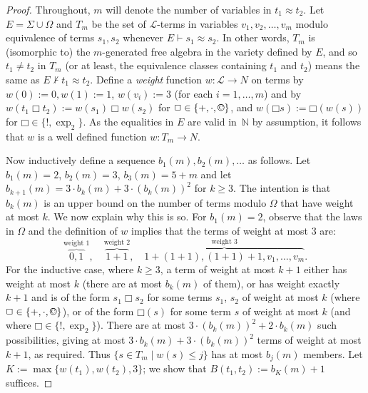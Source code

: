 \documentclass[eqnor,reqno]{amsart}
\theoremstyle{plain}
\theoremstyle{definition}
\newcommand{\cc}{\mathbin{\textup{\copyright}}}
\newcommand{\bbox}{\mathbin{\Box}}
\begin{document}
\begin{proof}
Throughout, $m$ will denote the number of variables in $t_1\approx t_2$.
Let $E= \Sigma\cup\Omega$ and $T_m$ be the set of $\mathscr{L}$-terms in variables $v_1,v_2, \dots ,v_m$ modulo equivalence of terms $s_1,s_2$ whenever $E \vdash s_1\approx s_2$.  In other words, $T_m$ is (isomorphic to) the $m$-generated free algebra in the variety defined by $E$, and so $t_1 \neq t_2$ in $T_m$ (or at least, the equivalence classes containing $t_1$ and $t_2$) means the same as $E\nvdash t_1\approx t_2$. 
Define a \emph{weight} function $w: \mathscr{L} \rightarrow N$ on terms by $w(0):=0 ,w(1):=1$, $w(v_i):=3$ (for each $i=1,\dots,m$) and by $w(t_1 \bbox t_2):=w(s_1)\bbox w(s_2)$ for $\bbox \in \{+,\cdot,\cc\}$, and $w(\bbox s):=\bbox(w(s))$ for $\bbox\in \{!,\exp_2\}$.  As the equalities in $E$ are valid in~$\mathbb{N}$ by assumption, it follows that $w$ is a well defined function $w: T_m \rightarrow N$.
  
Now inductively define a sequence $b_1(m),b_2(m),\dots$ as follows. Let $b_1(m)=2$, $b_2(m)=3$, $b_3(m)=5+m$ and let  $b_{k+1}(m)=3\cdot b_k(m)+3 \cdot (b_k(m))^2$ for $k\geq 3$.  
The intention is that $b_k(m)$ is an upper bound on the number of terms modulo $\Omega$ that have weight at most $k$.  
We now explain why this is so.   
For $b_1(m)=2$, observe that the laws in $\Omega$ and the definition of $w$ implies that the terms of weight at most $3$ are:
\[
\stackrel{\text{weight 1}}{\overbrace{0, 1}},\quad  \stackrel{\text{weight 2}}{\overbrace{1+1}},\quad  \stackrel{\text{weight 3}}{\overbrace{1+(1+1),(1+1)+1,v_1,\dots,v_m}}.
\]
For the inductive case, where $k\geq 3$, a term of weight at most $k+1$ either has weight at most $k$ (there are at most $b_k(m)$ of them), or has weight exactly $k+1$ and is of the form $s_1 \bbox s_2$ for some terms $s_1$, $s_2$ of weight at most $k$ (where $\bbox \in \{+,\cdot,\cc\}$),  or of the form $\bbox(s)$ for some term $s$ of weight at most $k$ (and where $\bbox\in \{!,\exp_2\}$).  
There are at most $3 \cdot (b_k(m))^2+2\cdot b_k(m)$ such possibilities, giving at most $3\cdot b_k(m)+3 \cdot (b_k(m))^2$ terms of weight at most $k+1$, as required.
Thus $\{s \in T_m \mid w(s)\leq j\}$ has at most $b_j(m)$ members. 
Let $K:=\max\{w(t_1),w(t_2),3\}$; we show that $B(t_1,t_2):=b_K(m)+1$ suffices.


\end{proof}
\end{document}
